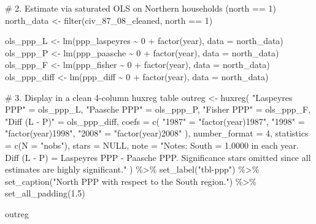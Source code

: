\documentclass[
  letterpaper,
  DIV=11,
  numbers=noendperiod]{scrartcl}
\newenvironment{Shaded}{\begin{snugshade}}{\end{snugshade}}
\newcommand{\AttributeTok}[1]{\textcolor[rgb]{0.40,0.45,0.13}{#1}}
\newcommand{\CommentTok}[1]{\textcolor[rgb]{0.37,0.37,0.37}{#1}}
\newcommand{\ConstantTok}[1]{\textcolor[rgb]{0.56,0.35,0.01}{#1}}
\newcommand{\DecValTok}[1]{\textcolor[rgb]{0.68,0.00,0.00}{#1}}
\newcommand{\FloatTok}[1]{\textcolor[rgb]{0.68,0.00,0.00}{#1}}
\newcommand{\FunctionTok}[1]{\textcolor[rgb]{0.28,0.35,0.67}{#1}}
\newcommand{\NormalTok}[1]{\textcolor[rgb]{0.00,0.23,0.31}{#1}}
\newcommand{\OtherTok}[1]{\textcolor[rgb]{0.00,0.23,0.31}{#1}}
\newcommand{\SpecialCharTok}[1]{\textcolor[rgb]{0.37,0.37,0.37}{#1}}
\newcommand{\StringTok}[1]{\textcolor[rgb]{0.13,0.47,0.30}{#1}}
\begin{document}
\begin{Shaded}
\begin{Highlighting}[]
\CommentTok{\# 2. Estimate via saturated OLS on Northern households (north == 1)}
\NormalTok{north\_data }\OtherTok{\textless{}{-}} \FunctionTok{filter}\NormalTok{(civ\_87\_08\_cleaned, north }\SpecialCharTok{==} \DecValTok{1}\NormalTok{)}

\NormalTok{ols\_ppp\_L }\OtherTok{\textless{}{-}} \FunctionTok{lm}\NormalTok{(ppp\_laspeyres }\SpecialCharTok{\textasciitilde{}} \DecValTok{0} \SpecialCharTok{+} \FunctionTok{factor}\NormalTok{(year), }\AttributeTok{data =}\NormalTok{ north\_data)}
\NormalTok{ols\_ppp\_P }\OtherTok{\textless{}{-}} \FunctionTok{lm}\NormalTok{(ppp\_paasche   }\SpecialCharTok{\textasciitilde{}} \DecValTok{0} \SpecialCharTok{+} \FunctionTok{factor}\NormalTok{(year), }\AttributeTok{data =}\NormalTok{ north\_data)}
\NormalTok{ols\_ppp\_F }\OtherTok{\textless{}{-}} \FunctionTok{lm}\NormalTok{(ppp\_fisher    }\SpecialCharTok{\textasciitilde{}} \DecValTok{0} \SpecialCharTok{+} \FunctionTok{factor}\NormalTok{(year), }\AttributeTok{data =}\NormalTok{ north\_data)}
\NormalTok{ols\_ppp\_diff }\OtherTok{\textless{}{-}} \FunctionTok{lm}\NormalTok{(ppp\_diff      }\SpecialCharTok{\textasciitilde{}} \DecValTok{0} \SpecialCharTok{+} \FunctionTok{factor}\NormalTok{(year), }\AttributeTok{data =}\NormalTok{ north\_data)}

\CommentTok{\# 3. Display in a clean 4{-}column huxreg table}
\NormalTok{outreg }\OtherTok{\textless{}{-}} \FunctionTok{huxreg}\NormalTok{(}
  \StringTok{"Laspeyres PPP"} \OtherTok{=}\NormalTok{ ols\_ppp\_L,}
  \StringTok{"Paasche PPP"} \OtherTok{=}\NormalTok{ ols\_ppp\_P,}
  \StringTok{"Fisher PPP"} \OtherTok{=}\NormalTok{ ols\_ppp\_F,}
  \StringTok{"Diff (L {-} P)"} \OtherTok{=}\NormalTok{ ols\_ppp\_diff,}
  \AttributeTok{coefs =} \FunctionTok{c}\NormalTok{(}
    \StringTok{"1987"} \OtherTok{=} \StringTok{"factor(year)1987"}\NormalTok{,}
    \StringTok{"1998"} \OtherTok{=} \StringTok{"factor(year)1998"}\NormalTok{,}
    \StringTok{"2008"} \OtherTok{=} \StringTok{"factor(year)2008"}
\NormalTok{  ),}
  \AttributeTok{number\_format =} \DecValTok{4}\NormalTok{,}
  \AttributeTok{statistics =} \FunctionTok{c}\NormalTok{(}\AttributeTok{N =} \StringTok{"nobs"}\NormalTok{),}
  \AttributeTok{stars =} \ConstantTok{NULL}\NormalTok{,}
  \AttributeTok{note =} \StringTok{"Notes: South = 1.0000 in each year. Diff (L {-} P) = Laspeyres PPP {-} Paasche PPP. Significance stars omitted since all estimates are highly significant."}
\NormalTok{) }\SpecialCharTok{\%\textgreater{}\%}
  \FunctionTok{set\_label}\NormalTok{(}\StringTok{"tbl{-}ppp"}\NormalTok{) }\SpecialCharTok{\%\textgreater{}\%}
  \FunctionTok{set\_caption}\NormalTok{(}\StringTok{"North PPP with respect to the South region."}\NormalTok{) }\SpecialCharTok{\%\textgreater{}\%}
  \FunctionTok{set\_all\_padding}\NormalTok{(}\FloatTok{1.5}\NormalTok{)}

\NormalTok{outreg}
\end{Highlighting}
\end{Shaded}
\end{document}
